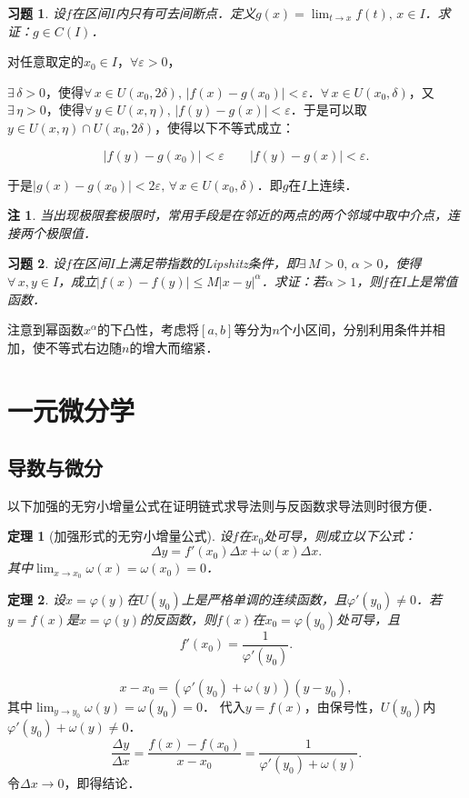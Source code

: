\documentclass[11pt,a4paper]{ctexart}
\makeatletter
\theoremstyle{thmseries} %
\newtheorem{thm}{定理}[section]
\theoremstyle{exerseries}
\newtheorem{exer}{习题}[section]
\newtheorem*{rem}{注}
\renewenvironment{proof}[1][\proofname]{\par
  \pushQED{\qed}%
  \normalfont \topsep6\p@\@plus6\p@\relax
  \trivlist
  \item[\hskip\labelsep
        \itshape
    #1\@addpunct{}]\ignorespaces
}{%
  \popQED\endtrivlist\@endpefalse
}
\newenvironment{pf}{\begin{proof}[\bfseries\upshape 证\quad]}{\end{proof}}
\newcommand{\bra}[1]{\mathopen{}\left(#1\right)}
\renewcommand{\epsilon}{\varepsilon}
\renewcommand{\phi}{\varphi}
\makeatother
\begin{document}
\begin{exer}
	设$f$在区间$I$内只有可去间断点．定义$g(x)=\lim_{t\to x}f(t),\,x\in I$．求证：$g\in C(I)$．
\end{exer}
\begin{pf}
	对任意取定的$x_0\in I$，$\forall \epsilon>0$，

	$\exists\,\delta>0$，使得$\forall\, x\in U(x_0,2\delta),\,|f(x)-g(x_0)|<\epsilon$．$\forall\,x\in U(x_0,\delta)$，又$\exists\,\eta>0$，使得$\forall\,y\in U(x,\eta),\,|f(y)-g(x)|<\epsilon$．于是可以取$y\in U(x,\eta)\cap U(x_0,2\delta)$，使得以下不等式成立：

	\[|f(y)-g(x_0)|<\epsilon\qquad|f(y)-g(x)|<\epsilon.\]

	于是$|g(x)-g(x_0)|<2\epsilon,\,\forall\,x\in U(x_0,\delta)$．即$g$在$I$上连续．
\end{pf}
\begin{rem}
	当出现极限套极限时，常用手段是在邻近的两点的两个邻域中取中介点，连接两个极限值．
\end{rem}

\begin{exer}
	设$f$在区间$I$上满足带指数的Lipshitz条件，即$\exists\,M>0,\,\alpha>0$，使得$\forall\,x,y\in I$，成立$|f(x)-f(y)|\leq M|x-y|^\alpha$．求证：若$\alpha>1$，则$f$在$I$上是常值函数．
\end{exer}
\begin{pf}
	注意到幂函数$x^\alpha$的下凸性，考虑将$[a,b]$等分为$n$个小区间，分别利用条件并相加，使不等式右边随$n$的增大而缩紧．
\end{pf}


\section{一元微分学}
\subsection{导数与微分}
以下加强的无穷小增量公式在证明链式求导法则与反函数求导法则时很方便．
\begin{thm}[加强形式的无穷小增量公式]
	设$f$在$x_0$处可导，则成立以下公式：
	\[\Delta y=f'(x_0)\Delta x+\omega(x)\Delta x.\]
	其中$\lim_{x\to x_0}\omega(x)=\omega(x_0)=0$．
\end{thm}

\begin{thm}
	设$x=\phi(y)$在$U(y_0)$上是严格单调的连续函数，且$\phi'(y_0)\neq0$．若$y=f(x)$是$x=\phi(y)$的反函数，则$f(x)$在$x_0=\phi(y_0)$处可导，且
	\[f'(x_0)=\frac{1}{\phi'(y_0)}.\]
\end{thm}
\begin{pf}
	\[x-x_0=\bra{\phi'(y_0)+\omega(y)}(y-y_0),\]
	其中$\lim_{y\to y_0}\omega(y)=\omega(y_0)=0$．
	代入$y=f(x)$，由保号性，$U(y_0)$内$\phi'(y_0)+\omega(y)\neq0$．
	\[\frac{\Delta y}{\Delta x}=\frac{f(x)-f(x_0)}{x-x_0}=\frac{1}{\phi'(y_0)+\omega(y)}.\]
	令$\Delta x\to0$，即得结论．
\end{pf}
\end{document}
